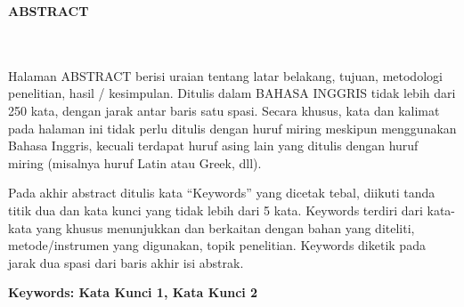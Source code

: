 \clearpage
{}%
\thispagestyle{fancy}

\begin{center}
	\large \bfseries \MakeUppercase{Abstract}\\
	\normalsize \normalfont {\thetitleEN}\\
	\normalsize \normalfont {\theauthor}\\
	\bigskip
	
	\normalsize \normalfont \justifying \singlespacing
	Halaman ABSTRACT berisi uraian tentang latar belakang, tujuan, metodologi penelitian, hasil / kesimpulan. Ditulis dalam BAHASA INGGRIS tidak lebih dari 250 kata, dengan jarak antar baris satu spasi. Secara khusus, kata dan kalimat pada halaman ini tidak perlu ditulis dengan huruf miring meskipun menggunakan Bahasa Inggris, kecuali terdapat huruf asing lain yang ditulis dengan huruf miring (misalnya huruf Latin atau Greek, dll). \par
	
	Pada akhir abstract ditulis kata “Keywords” yang dicetak tebal, diikuti tanda titik dua dan kata kunci yang tidak lebih dari 5 kata. Keywords terdiri dari kata-kata yang khusus menunjukkan dan berkaitan dengan bahan yang diteliti, metode/instrumen yang digunakan, topik penelitian. Keywords diketik pada jarak dua spasi dari baris akhir isi abstrak.\par
	
	\textbf{Keywords: Kata Kunci 1, Kata Kunci 2}
	
	\vfill
	
\end{center}
\clearpage